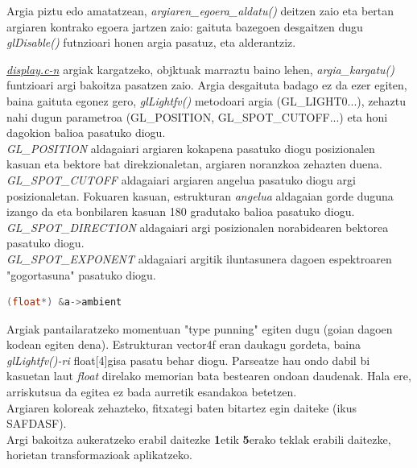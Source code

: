 \documentclass[12pt]{article}
\newcommand{\fitxategi}[1] {\underline{\textit{#1}}}
\newcommand{\metodo}[1] {\textit{#1}}
\newcommand{\aldagai}[1] {\textit{#1}}
\newcommand{\tekla}[1] {\textbf{#1}}
\begin{document}
Argia piztu edo amatatzean, \metodo{argiaren\_egoera\_aldatu()} deitzen zaio eta bertan argiaren kontrako egoera jartzen zaio: gaituta bazegoen desgaitzen dugu \metodo{glDisable()} futnzioari honen argia pasatuz, eta alderantziz.

\fitxategi{display.c-n} argiak kargatzeko, objktuak marraztu baino lehen, \metodo{argia\_kargatu()} funtzioari argi bakoitza pasatzen zaio. Argia desgaituta badago ez da ezer egiten, baina gaituta egonez gero, \metodo{glLightfv()} metodoari argia (GL\_LIGHT0...), zehaztu nahi dugun parametroa (GL\_POSITION, GL\_SPOT\_CUTOFF...) eta honi dagokion balioa pasatuko diogu.\\

\aldagai{GL\_POSITION} aldagaiari argiaren kokapena pasatuko diogu posizionalen kasuan eta bektore bat direkzionaletan, argiaren noranzkoa zehazten duena.\\

\aldagai{GL\_SPOT\_CUTOFF} aldagaiari argiaren angelua pasatuko diogu argi posizionaletan. Fokuaren kasuan, estrukturan \aldagai{angelua} aldagaian gorde duguna izango da eta bonbilaren kasuan 180 gradutako balioa pasatuko diogu.\\

\aldagai{GL\_SPOT\_DIRECTION} aldagaiari argi posizionalen norabidearen bektorea pasatuko diogu.\\

\aldagai{GL\_SPOT\_EXPONENT} aldagaiari argitik iluntasunera dagoen espektroaren "gogortasuna" pasatuko diogu.\\

\begin{lstlisting}[language=C]
(float*) &a->ambient
\end{lstlisting}

Argiak pantailaratzeko momentuan "type punning"\cite{punning} egiten dugu (goian dagoen kodean egiten dena). Estrukturan vector4f eran daukagu gordeta, baina \metodo{glLightfv()-ri} float[4]gisa pasatu behar diogu. Parseatze hau ondo dabil bi kasuetan laut \aldagai{float} direlako memorian bata bestearen ondoan daudenak. Hala ere, arriskutsua da egitea ez bada aurretik esandakoa betetzen.\\

Argiaren koloreak zehazteko, fitxategi baten bitartez egin daiteke (ikus SAFDASF).\\

Argi bakoitza aukeratzeko erabil daitezke \tekla{1}etik \tekla{5}erako teklak erabili daitezke, horietan transformazioak aplikatzeko.
\end{document}
